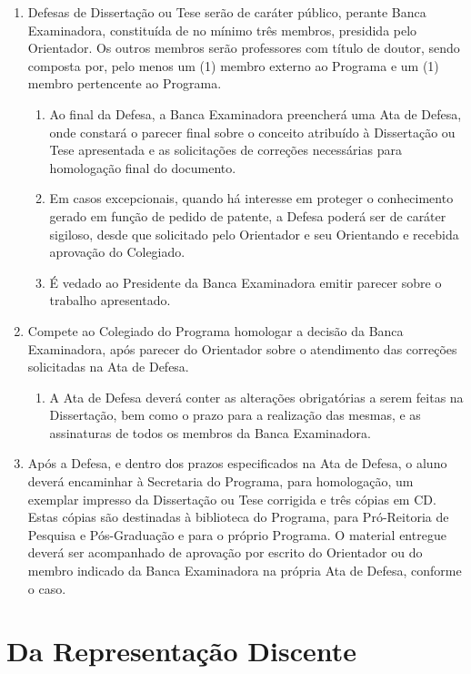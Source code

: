 \documentclass{article}
\newcommand{\singleitem}{\item[Parágrafo Único.]}
\begin{document}
\begin{enumerate}
	\item Defesas de Dissertação ou Tese serão de caráter público, perante Banca Examinadora, constituída de no mínimo três membros, presidida pelo Orientador. Os outros membros serão professores com título de doutor, sendo composta por, pelo menos um (1) membro externo ao Programa e um (1) membro pertencente ao Programa.
	\begin{enumerate}
		\item Ao final da Defesa, a Banca Examinadora preencherá uma Ata de Defesa, onde constará o parecer final sobre o conceito atribuído à Dissertação ou Tese apresentada e as solicitações de correções necessárias para homologação final do documento.
		\item Em casos excepcionais, quando há interesse em proteger o conhecimento gerado em função de pedido de patente, a Defesa poderá ser de caráter sigiloso, desde que solicitado pelo Orientador e seu Orientando e recebida aprovação do Colegiado.
		\item É vedado ao Presidente da Banca Examinadora emitir parecer sobre o trabalho apresentado.
	\end{enumerate}

	\item Compete ao Colegiado do Programa homologar a decisão da Banca Examinadora, após parecer do Orientador sobre o atendimento das correções solicitadas na Ata de Defesa.
	\begin{enumerate}
		\singleitem A Ata de Defesa deverá conter as alterações obrigatórias a serem feitas na Dissertação, bem como o prazo para a realização das mesmas, e as assinaturas de todos os membros da Banca Examinadora.
	\end{enumerate}
	\item Após a Defesa, e dentro dos prazos especificados na Ata de Defesa, o aluno deverá encaminhar à Secretaria do Programa, para homologação, um exemplar impresso da Dissertação ou Tese corrigida e três cópias em CD. Estas cópias são destinadas à biblioteca do Programa, para Pró-Reitoria de Pesquisa e Pós-Graduação e para o próprio Programa. O material entregue deverá ser acompanhado de aprovação por escrito do Orientador ou do membro indicado da Banca Examinadora na própria Ata de Defesa, conforme o caso.

\end{enumerate}

\section{Da Representação Discente}
\end{document}
